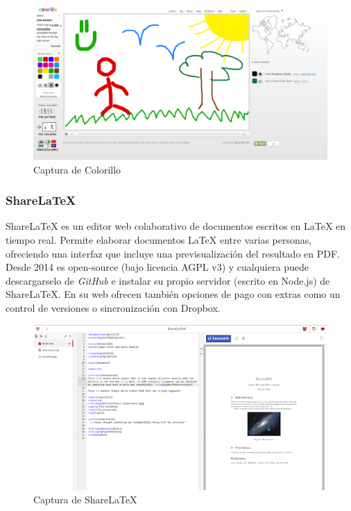 	\begin{figure}[H]
		\centering
			\includegraphics[keepaspectratio, scale=0.30]{Media/Captures/colorilloWeb.png}
		\caption{Captura de Colorillo}
		\label{fig:colorillo}
	\end{figure}  	
	
	\subsubsection{ShareLaTeX}
	
	ShareLaTeX \cite{ref:shareLatex} es un editor web colaborativo de documentos escritos en LaTeX en tiempo real. Permite elaborar documentos LaTeX entre varias personas, ofreciendo una interfaz que incluye una previsualización del resultado en PDF. Desde 2014 es open-source (bajo licencia AGPL v3) y cualquiera puede descargarselo de \textit{GitHub} e instalar su propio servidor (escrito en Node.js) de ShareLaTeX. En su web ofrecen también opciones de pago con extras como un control de versiones o sincronización con Dropbox.
	
	\begin{figure}[H]
		\centering
			\includegraphics[keepaspectratio, scale=0.60]{Media/Captures/shareLatexWeb.png}
		\caption{Captura de ShareLaTeX}
		\label{fig:shareLaTeX}
	\end{figure}  
		

